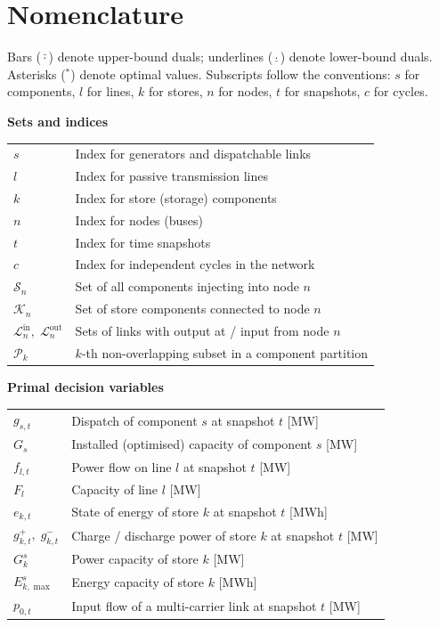 \documentclass{article}
\begin{document}
\bigskip

\section{Nomenclature}
\label{sec:nomenclature}

Bars ($\bar{\cdot}$) denote upper-bound duals; underlines ($\underline{\cdot}$)
denote lower-bound duals.  Asterisks (${}^*$) denote optimal values.
Subscripts follow the conventions: $s$ for components, $l$ for lines, $k$ for
stores, $n$ for nodes, $t$ for snapshots, $c$ for cycles.

\renewcommand{\arraystretch}{1.3}
\setlength{\tabcolsep}{5pt}

\noindent\textbf{Sets and indices}\par\smallskip
\noindent\begin{tabular}{lp{11cm}}
$s$ & Index for generators and dispatchable links \\
$l$ & Index for passive transmission lines \\
$k$ & Index for store (storage) components \\
$n$ & Index for nodes (buses) \\
$t$ & Index for time snapshots \\
$c$ & Index for independent cycles in the network \\
$\mathcal{S}_n$ & Set of all components injecting into node $n$ \\
$\mathcal{K}_n$ & Set of store components connected to node $n$ \\
$\mathcal{L}^{\mathrm{in}}_n,\;\mathcal{L}^{\mathrm{out}}_n$
    & Sets of links with output at / input from node $n$ \\
$\mathcal{P}_k$ & $k$-th non-overlapping subset in a component partition \\
\end{tabular}

\medskip
\noindent\textbf{Primal decision variables}\par\smallskip
\noindent\begin{tabular}{lp{11cm}}
$g_{s,t}$ & Dispatch of component $s$ at snapshot $t$ [MW] \\
$G_s$ & Installed (optimised) capacity of component $s$ [MW] \\
$f_{l,t}$ & Power flow on line $l$ at snapshot $t$ [MW] \\
$F_l$ & Capacity of line $l$ [MW] \\
$e_{k,t}$ & State of energy of store $k$ at snapshot $t$ [MWh] \\
$g^+_{k,t},\; g^-_{k,t}$ & Charge / discharge power of store $k$ at snapshot $t$ [MW] \\
$G^s_k$ & Power capacity of store $k$ [MW] \\
$E^s_{k,\max}$ & Energy capacity of store $k$ [MWh] \\
$p_{0,t}$ & Input flow of a multi-carrier link at snapshot $t$ [MW] \\
\end{tabular}
\end{document}
